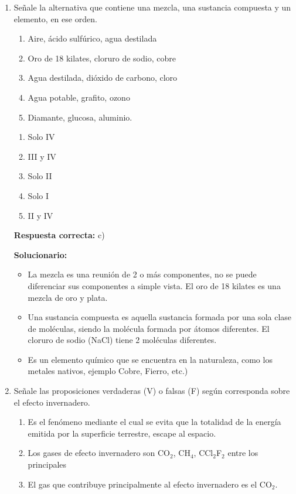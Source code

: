 \begin{enumerate}[resume]
	\item Señale la alternativa que contiene una mezcla, una sustancia compuesta y un elemento, en ese orden.

	\begin{enumerate}[label=\Roman*.]
		\item Aire, ácido sulfúrico, agua destilada
		\item Oro de 18 kilates, cloruro de sodio, cobre
		\item Agua destilada, dióxido de carbono, cloro
		\item Agua potable, grafito, ozono
		\item Diamante, glucosa, aluminio.
	\end{enumerate}

	\begin{enumerate}[label=\alph*)]
		\item Solo IV
		\item III y IV
		\item Solo II
		\item Solo I
		\item II y IV
	\end{enumerate}

	\textbf{Respuesta correcta:} c)

	\vspace{2mm}
	\textbf{Solucionario:}\

	\begin{itemize}
		\item La mezcla es una reunión de 2 o más componentes, no se puede diferenciar sus componentes a simple vista. El oro de 18 kilates es una mezcla de oro y plata.
		\item Una sustancia compuesta es aquella sustancia formada por una sola clase de moléculas, siendo la molécula formada por átomos diferentes. El cloruro de sodio (NaCl) tiene 2 moléculas diferentes.
		\item Es un elemento químico que se encuentra en la naturaleza, como los metales nativos, ejemplo Cobre, Fierro, etc.)
	\end{itemize}

	\vspace{6mm}

	\item Señale las proposiciones verdaderas (V) o falsas (F) según corresponda sobre el efecto invernadero.

	\begin{enumerate}[label=\Roman*.]
		\item Es el fenómeno mediante el cual se evita que la totalidad de la energía emitida por la superficie terrestre, escape al espacio.
		\item Los gases de efecto invernadero son CO$_2$, CH$_4$, CCl$_2$F$_2$ entre los principales
		\item El gas que contribuye principalmente al efecto invernadero es el CO$_2$.
	\end{enumerate}


\end{enumerate}
